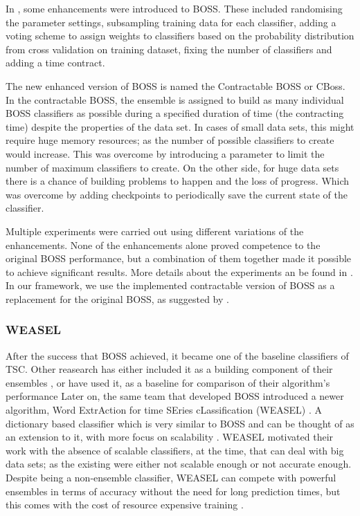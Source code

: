In \cite{middlehurst2019scalable}, some enhancements were introduced to BOSS.
These included randomising the parameter settings, subsampling training data for each classifier,
adding a voting scheme to assign weights to classifiers based on the probability distribution from cross validation on training dataset,
fixing the number of classifiers and adding a time contract.

The new enhanced version of BOSS is named the Contractable BOSS or CBoss.
In the contractable BOSS, the ensemble is assigned to build as many individual BOSS classifiers as possible during a specified duration of time (the contracting time) despite the properties of the data set.
In cases of small data sets, this might require huge memory resources; as the number of possible classifiers to create would increase.
This was overcome by introducing a parameter to limit the number of maximum classifiers to create.
On the other side, for huge data sets there is a chance of building problems to happen and the loss of progress.
Which was overcome by adding checkpoints to periodically save the current state of the classifier.

Multiple experiments were carried out using different variations of the enhancements.
None of the enhancements alone proved competence to the original BOSS performance, but a combination of them together made it possible to achieve significant results.
More details about the experiments an be found in \cite{middlehurst2019scalable}.
In our framework, we use the implemented contractable version of BOSS as a replacement for the original BOSS, as suggested by \cite{middlehurst2019scalable}.

\subsubsection{WEASEL}
\label{SubsubsectionWEASEL}
After the success that BOSS achieved, it became one of the baseline classifiers of TSC.
Other reasearch has either included it as a building component of their ensembles \cite{lines2018time, bagnall2015time},
or have used it, as a baseline for comparison of their algorithm's performance \cite{fawaz2020inceptiontime,shifaz2020ts,lucas2019proximity}
Later on, the same team that developed BOSS introduced a newer algorithm, Word ExtrAction for time SEries cLassification (WEASEL) \cite{schafer2017fast}.
A dictionary based classifier which is very similar to BOSS and can be thought of as an extension to it, with more focus on scalability \cite{middlehurst2019scalable}.
WEASEL motivated their work with the absence of scalable classifiers, at the time, that can deal with big data sets; as the existing were either not scalable enough
or not accurate enough. Despite being a non-ensemble classifier, WEASEL can compete with powerful ensembles in terms of accuracy without the need for
long prediction times, but this comes with the cost of resource expensive training \cite{middlehurst2019scalable}.

